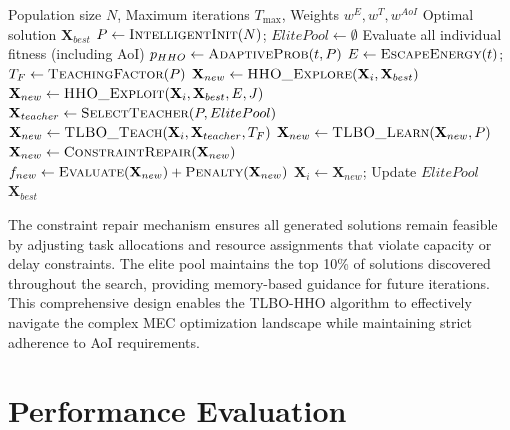\documentclass[conference]{IEEEtran}
\begin{document}
\begin{algorithm}[!t]
  \small
  \caption{TLBO-HHO Two-Phase Integration Algorithm (with AoI Optimization)}
  \label{alg:tlbo_hho_aoi}
  \begin{algorithmic}[1]
    \REQUIRE Population size $N$, Maximum iterations $T_{\max}$, Weights $w^E, w^T, w^{AoI}$
    \ENSURE Optimal solution $\mathbf{X}_{best}$
    \STATE $P \leftarrow \textsc{IntelligentInit}(N)$; $ElitePool \leftarrow \emptyset$
    \STATE Evaluate all individual fitness (including AoI)
        \STATE $p_{HHO} \leftarrow \textsc{AdaptiveProb}(t, P)$
        \STATE $E \leftarrow \textsc{EscapeEnergy}(t)$; $T_F \leftarrow \textsc{TeachingFactor}(P)$
                    \STATE $\mathbf{X}_{new} \leftarrow \textsc{HHO\_Explore}(\mathbf{X}_i, \mathbf{X}_{best})$
                \ELSE
                    \STATE $\mathbf{X}_{new} \leftarrow \textsc{HHO\_Exploit}(\mathbf{X}_i, \mathbf{X}_{best}, E, J)$
                \ENDIF
            \ELSE
                \STATE $\mathbf{X}_{teacher} \leftarrow \textsc{SelectTeacher}(P, ElitePool)$
                \STATE $\mathbf{X}_{new} \leftarrow \textsc{TLBO\_Teach}(\mathbf{X}_i, \mathbf{X}_{teacher}, T_F)$
                \STATE $\mathbf{X}_{new} \leftarrow \textsc{TLBO\_Learn}(\mathbf{X}_{new}, P)$
            \ENDIF
            \STATE $\mathbf{X}_{new} \leftarrow \textsc{ConstraintRepair}(\mathbf{X}_{new})$
            \STATE $f_{new} \leftarrow \textsc{Evaluate}(\mathbf{X}_{new}) + \textsc{Penalty}(\mathbf{X}_{new})$
                \STATE $\mathbf{X}_i \leftarrow \mathbf{X}_{new}$; Update $ElitePool$
            \ENDIF
        \ENDFOR
    \ENDFOR
    \RETURN $\mathbf{X}_{best}$
  \end{algorithmic}
\end{algorithm}

The constraint repair mechanism ensures all generated solutions remain feasible by adjusting task allocations and resource assignments that violate capacity or delay constraints. The elite pool maintains the top 10\% of solutions discovered throughout the search, providing memory-based guidance for future iterations. This comprehensive design enables the TLBO-HHO algorithm to effectively navigate the complex MEC optimization landscape while maintaining strict adherence to AoI requirements.

\section{Performance Evaluation}
\end{document}
